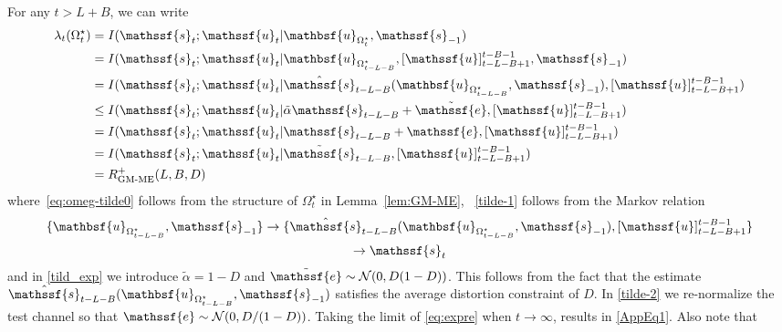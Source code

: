 \documentclass[journal, twocolumn, 10pt]{IEEEtran}
\newcommand{\cN}{{\mathcal{N}}}
\newcommand{\rve}{{\mathssf{e}}}    %
\newcommand{\rvs}{{\mathssf{s}}}    %
\newcommand{\rvu}{{\mathssf{u}}}    %
\newcommand{\rvbu}{{\mathbsf{u}}}
\begin{document}
{For any $t> L+B$, we can write
\begin{align}
 \lambda_{t}(\Omega^{\star}_t) &=  I(\rvs_{t};\rvu_{t} | \rvbu_{\Omega^{\star}_{t}}, \rvs_{-1})\\ 
&= I(\rvs_{t};\rvu_{t} | \rvbu_{\Omega^{\star}_{t-L-B}}, [\rvu]_{t-L-B+1}^{t-B-1}, \rvs_{-1}) \label{eq:omeg-tilde0}\\
&= I(\rvs_{t};\rvu_{t} | \hat{\rvs}_{t-L-B}(\rvbu_{\Omega^{\star}_{t-L-B}}, \rvs_{-1}) ,  [\rvu]_{t-L-B+1}^{t-B-1})\label{tilde-1}\\
& \le  I(\rvs_{t};\rvu_{t} | \tilde{\alpha} {\rvs}_{t-L-B} + \tilde{\rve} ,  [\rvu]_{t-L-B+1}^{t-B-1}) \label{tild_exp}\\
& = I(\rvs_{t};\rvu_{t} | {\rvs}_{t-L-B} + {\rve} ,  [\rvu]_{t-L-B+1}^{t-B-1})\notag\\
& = I(\rvs_{t};\rvu_{t} | \tilde{\rvs}_{t-L-B} ,  [\rvu]_{t-L-B+1}^{t-B-1})\label{tilde-2}\\
& = R^{+}_{\textrm{GM-ME}}(L,B,D) \label{eq:expre}
\end{align} where~\eqref{eq:omeg-tilde0} follows from the structure of $\Omega_t^\star$ in Lemma~\ref{lem:GM-ME},
~\eqref{tilde-1} follows from the Markov relation\begin{multline}
\{\rvbu_{\Omega^{\star}_{t-L-B}}, \rvs_{-1}\} \rightarrow \{\hat{\rvs}_{t-L-B}(\rvbu_{\Omega^{\star}_{t-L-B}}, \rvs_{-1} ), [\rvu]_{t-L-B+1}^{t-B-1} \}\\\rightarrow \rvs_{t} \label{eq:G-ME-Markov-1}
\end{multline}and in \eqref{tild_exp} we introduce ${\tilde{\alpha} = 1-D}$ and ${\tilde{\rve} \sim \cN(0, D(1-D))}$. This follows from the fact that the estimate $\hat{\rvs}_{t-L-B}(\rvbu_{\Omega^{\star}_{t-L-B}}, \rvs_{-1})$ satisfies the average distortion constraint of $D$. In \eqref{tilde-2} we re-normalize the test channel so that $\rve \sim \cN(0,D/(1-D))$. Taking the limit of \eqref{eq:expre} when $t\to\infty$, results in \eqref{AppEq1}. Also note that 

}
\end{document}
